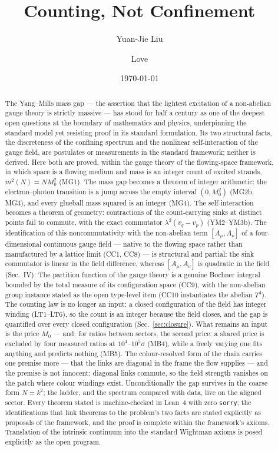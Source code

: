 \documentclass[aps,prd,preprint,superscriptaddress,amsmath,amssymb]{revtex4-2}
\begin{document}
\title{Counting, Not Confinement}

\author{Yuan-Jie Liu}
\author{Love}

\date{\today}

\begin{abstract}
The Yang--Mills mass gap --- the assertion that the lightest
excitation of a non-abelian gauge theory is strictly massive --- has
stood for half a century as one of the deepest open questions at the
boundary of mathematics and physics, underpinning the standard model
yet resisting proof in its standard formulation.  Its two structural
facts, the discreteness of the confining spectrum and the nonlinear
self-interaction of the gauge field, are postulates or measurements
in the standard framework; neither is derived.  Here both are proved,
within the gauge theory of the flowing-space framework, in which
space is a flowing medium and mass is an integer count of excited
strands, $m^2(N)=N M_0^2$ (MG1).  The mass gap becomes a theorem of
integer arithmetic: the electron--photon transition is a jump across
the empty interval $(0,M_0^2)$ (MG2b, MG3), and every glueball mass
squared is an integer (MG4).  The self-interaction becomes a theorem
of geometry: contractions of the count-carrying sinks at distinct
points fail to commute, with the exact commutator
$\lambda^2(v_q-v_p)$ (YM2--YM3b).  The identification of this
noncommutativity with the non-abelian term $[A_\mu,A_\nu]$ of a
four-dimensional continuous gauge field --- native to the flowing
space rather than manufactured by a lattice limit (CC1, CC8) --- is
structural and partial: the sink commutator is linear in the field
difference, whereas $[A_\mu,A_\nu]$ is quadratic in the field
(Sec.~IV).  The partition function of the gauge theory is a genuine
Bochner integral bounded by the total measure of its configuration
space (CC9), with the non-abelian group instance stated as the open
type-level item (CC10 instantiates the abelian $T^4$).  The counting law
is no longer an input: a closed configuration of the field has integer
winding (LT1--LT6), so the count is an integer because the field closes,
and the gap is quantified over every closed configuration
(Sec.~\ref{sec:closure}).  What remains an input is the price $M_0$ ---
and, for ratios between sectors, the second price: a shared price is
excluded by four measured ratios at $10^4$--$10^5\sigma$ (MB4), while a
freely varying one fits anything and predicts nothing (MB5).  The
colour-resolved form of the chain carries one premise more --- that the
links are diagonal in the frame the flow supplies --- and the premise is
not innocent: diagonal links commute, so the field strength vanishes on
the patch where colour windings exist.  Unconditionally the gap survives in
the coarse form $N=k^2$; the ladder, and the spectrum compared with data,
live on the aligned sector.  Every
theorem stated is machine-checked in Lean~4 with
zero \texttt{sorry}; the identifications that link theorems to the
problem's two facts are stated explicitly as proposals of the
framework, and the proof is complete within the framework's
axioms.  Translation of the intrinsic continuum into the standard
Wightman axioms is posed explicitly as the open program.


\end{abstract}
\end{document}
